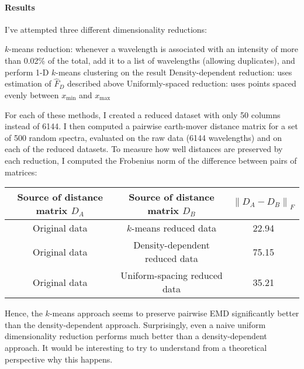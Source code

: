 \documentclass[11pt]{article}
\newcommand{\norm}[1]{\left\lVert#1\right\rVert}
\newcommand{\xmin}{x_\mathrm{min}}
\newcommand{\xmax}{x_\mathrm{max}}
\theoremstyle{definition}
\begin{document}
\paragraph{Results} I've attempted three different dimensionality reductions:

\begin{outline}[enumerate]
\1 $k$-means reduction: whenever a wavelength is associated with an intensity of more than 0.02\% of the total, add it to a list of wavelengths (allowing duplicates), and perform 1-D $k$-means clustering on the result
\1 Density-dependent reduction: uses estimation of $\hat F_D$ described above
\1 Uniformly-spaced reduction: uses points spaced evenly between $\xmin$ and $\xmax$
\end{outline}

For each of these methods, I created a reduced dataset with only 50 columns instead of 6144.
I then computed a pairwise earth-mover distance matrix for a set of 500 random spectra, evaluated on the raw data (6144 wavelengths) and on each of the reduced datasets.
To measure how well distances are preserved by each reduction, I computed the Frobenius norm of the difference between pairs of matrices:
\begin{center}
\begin{tabular}{c|c|c}
Source of distance matrix $D_A$ & Source of distance matrix $D_B$ & $\norm{D_A-D_B}_F$ \\ \hline
Original data & $k$-means reduced data         & 22.94 \\
Original data & Density-dependent reduced data & 75.15 \\
Original data & Uniform-spacing reduced data   & 35.21
\end{tabular}
\end{center}

Hence, the $k$-means approach seems to preserve pairwise EMD significantly better than the density-dependent approach.  Surprisingly, even a naive uniform dimensionality reduction performs much better than a density-dependent approach.  It would be interesting to try to understand from a theoretical perspective why this happens.
\end{document}
